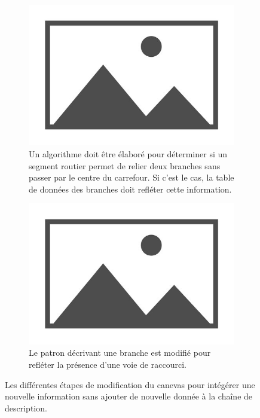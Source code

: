 \begin{figure}[ht]
    \centering
    \begin{subfigure}[t]{0.49\linewidth}
        \includegraphics[width=\textwidth]{images/placeholder.jpg}
        \caption{Un algorithme doit être élaboré pour déterminer si un segment routier permet de relier deux branches sans passer par le centre du carrefour. Si c'est le cas, la  table de données des branches doit refléter cette information.}
    \end{subfigure}
    \begin{subfigure}[t]{0.49\linewidth}
        \includegraphics[width=\textwidth]{images/placeholder.jpg}
        \caption{Le patron décrivant une branche est modifié pour refléter la présence d'une voie de raccourci.}
    \end{subfigure}
    \caption{Les différentes étapes de modification du canevas pour intégérer une nouvelle information sans ajouter de nouvelle donnée à la chaîne de description.}
    \label{fig:evaluation_ex_nouvelle_information_sans_ajout}
\end{figure}

